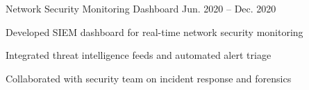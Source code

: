 \begin{cventries}
  \cventry
    {Network Security Monitoring Dashboard} %
    {} %
    {} %
    {Jun. 2020 -- Dec. 2020} %
    {
      \begin{cvitems}
        \item {Developed SIEM dashboard for real-time network security monitoring}
        \item {Integrated threat intelligence feeds and automated alert triage}
        \item {Collaborated with security team on incident response and forensics}
      \end{cvitems}
    }

\end{cventries}
